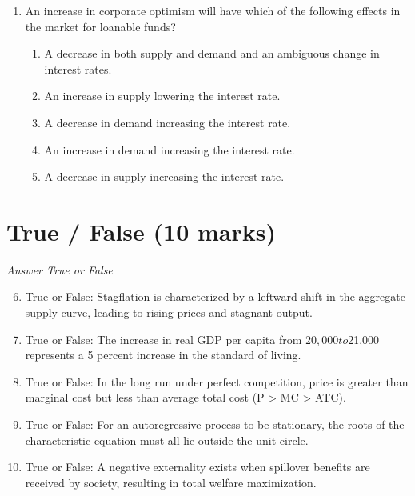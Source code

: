 \documentclass[12pt]{article}
\begin{document}
\begin{enumerate}[label=\arabic*.]
\begin{enumerate}[label=(\alph*)]
    \item the anticipated inflation rate plus the nominal interest rate
    \item the nominal interest rate multiplied by the inflation rate
    \item what one sees when looking at bank literature
    \item the anticipated inflation rate minus the nominal interest rate
    \item the nominal interest rate minus anticipated inflation
\end{enumerate}
\item An increase in corporate optimism will have which of the following effects in the market for loanable funds?
\begin{enumerate}[label=(\alph*)]
    \item A decrease in both supply and demand and an ambiguous change in interest rates.
    \item An increase in supply lowering the interest rate.
    \item A decrease in demand increasing the interest rate.
    \item An increase in demand increasing the interest rate.
    \item A decrease in supply increasing the interest rate.
\end{enumerate}
\end{enumerate}

\section*{True / False (10 marks)}
\textit{Answer True or False}
\begin{enumerate}[label=\arabic*.]
\setcounter{enumi}{5}
\item True or False: Stagflation is characterized by a leftward shift in the aggregate supply curve, leading to rising prices and stagnant output.
\item True or False: The increase in real GDP per capita from $20,000 to $21,000 represents a 5 percent increase in the standard of living.
\item True or False: In the long run under perfect competition, price is greater than marginal cost but less than average total cost (P \textgreater{} MC \textgreater{} ATC).
\item True or False: For an autoregressive process to be stationary, the roots of the characteristic equation must all lie outside the unit circle.
\item True or False: A negative externality exists when spillover benefits are received by society, resulting in total welfare maximization.
\end{enumerate}
\end{document}
